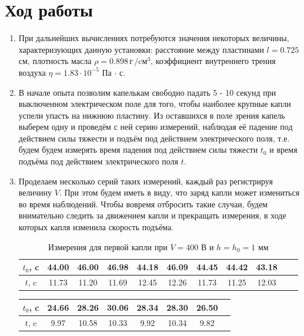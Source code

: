 \documentclass[12pt]{article}
\begin{document}
\section*{Ход работы}
\begin{enumerate}
	\item
		При дальнейших вычислениях потребуются значения некоторых величины, характеризующих данную установки: расстояние между пластинами $l = 0.725$ см, плотность масла $\rho = 0.898 \, \text{г}\, / \text{cм}^3$, коэффициент внутреннего трения воздуха $\eta = 1.83 \cdot 10^{-5}$ Па $\cdot$ с.
	\item
		В начале опыта позволим капелькам свободно падать 5 - 10 секунд при выключенном электрическом поле для того, чтобы наиболее крупные капли успели упасть на нижнюю пластину. Из оставшихся в поле зрения капель выберем одну и проведём с ней серию измерений, наблюдая её падение под действием силы тяжести и подъём под действием электрического поля, т.е. будем будем измерять время падения под действием силы тяжести $t_0$ и время подъёма под действием электрического поля $t$. 
	\item	
	 	Проделаем несколько серий таких измерений, каждый раз регистрируя величину $V$. При этом будем иметь в виду, что заряд капли может измениться во время наблюдений. Чтобы вовремя отбросить такие случаи, будем внимательно следить за движением капли и прекращать измерения, в ходе которых капля изменила скорость подъёма.	 	
		\begin{table}[h!]
			\centering
			\begin{tabular}{|c|c|c|c|c|c|c|c|c|c|c|}
 	           \hline
    	        $t_0$, c & 44.00 & 46.00 & 46.98 & 44.18 & 46.09 & 44.45 & 44.42 & 43.18	  \\
        	   \hline
      		   $t$, c & 11.73 & 11.20 & 11.69 & 12.45 & 12.26 & 11.73 & 11.25 & 12.03  \\			
			   \hline
			\end{tabular}
			\caption{Измерения для первой капли при $V = 400 $ В и $h = h_0 = 1$ мм}
		\end{table}
		\begin{table}[h!]
			\centering
			\begin{tabular}{|c|c|c|c|c|c|c|c|}
 	           \hline
    	        $t_0$, c & 24.66 & 28.26 & 30.06 & 28.34 & 28.30 & 26.50 \\
        	   \hline
      		   $t$, c & 9.97 & 10.58 & 10.33 & 9.92 & 10.34 & 9.82 \\
			   \hline
			\end{tabular}

\end{table}
\end{enumerate}
\end{document}
